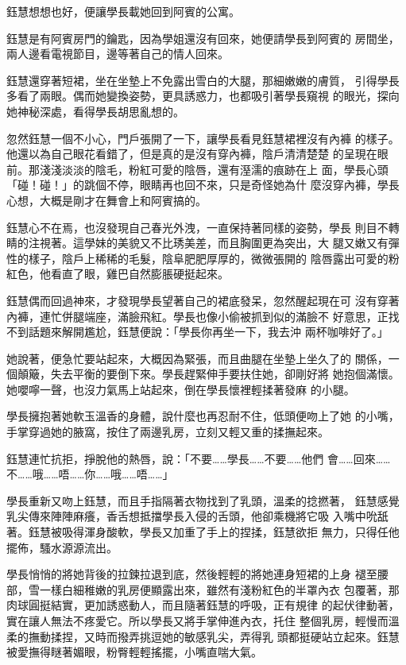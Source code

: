 鈺慧想想也好，便讓學長載她回到阿賓的公寓。

鈺慧是有阿賓房門的鑰匙，因為學姐還沒有回來，她便請學長到阿賓的
房間坐，兩人邊看電視節目，邊等著自己的情人回來。

鈺慧還穿著短裙，坐在坐墊上不免露出雪白的大腿，那細嫩嫩的膚質，
引得學長多看了兩眼。偶而她變換姿勢，更具誘惑力，也都吸引著學長窺視
的眼光，探向她神秘深處，看得學長胡思亂想的。

忽然鈺慧一個不小心，門戶張開了一下，讓學長看見鈺慧裙裡沒有內褲
的樣子。他還以為自己眼花看錯了，但是真的是沒有穿內褲，陰戶清清楚楚
的呈現在眼前。那淺淺淡淡的陰毛，粉紅可愛的陰唇，還有溼濡的痕跡在上
面，學長心頭「碰！碰！」的跳個不停，眼睛再也回不來，只是奇怪她為什
麼沒穿內褲，學長心想，大概是剛才在舞會上和阿賓搞的。

鈺慧心不在焉，也沒發現自己春光外洩，一直保持著同樣的姿勢，學長
則目不轉睛的注視著。這學妹的美貌又不比琇美差，而且胸圍更為突出，大
腿又嫩又有彈性的樣子，陰戶上稀稀的毛髮，陰阜肥肥厚厚的，微微張開的
陰唇露出可愛的粉紅色，他看直了眼，雞巴自然膨脹硬挺起來。

鈺慧偶而回過神來，才發現學長望著自己的裙底發呆，忽然醒起現在可
沒有穿著內褲，連忙併腿端座，滿臉飛紅。學長也像小偷被抓到似的滿臉不
好意思，正找不到話題來解開尷尬，鈺慧便說：「學長你再坐一下，我去沖
兩杯咖啡好了。」

她說著，便急忙要站起來，大概因為緊張，而且曲腿在坐墊上坐久了的
關係，一個顛簸，失去平衡的要倒下來。學長趕緊伸手要扶住她，卻剛好將
她抱個滿懷。她嚶嚀一聲，也沒力氣馬上站起來，倒在學長懷裡輕揉著發麻
的小腿。

學長擁抱著她軟玉溫香的身體，說什麼也再忍耐不住，低頭便吻上了她
的小嘴，手掌穿過她的腋窩，按住了兩邊乳房，立刻又輕又重的揉撫起來。

鈺慧連忙抗拒，掙脫他的熱唇，說：「不要……學長……不要……他們
會……回來……不……哦……唔……你……哦……唔……」

學長重新又吻上鈺慧，而且手指隔著衣物找到了乳頭，溫柔的捻撚著，
鈺慧感覺乳尖傳來陣陣麻癢，香舌想抵擋學長入侵的舌頭，他卻乘機將它吸
入嘴中吮舐著。鈺慧被吸得渾身酸軟，學長又加重了手上的捏揉，鈺慧欲拒
無力，只得任他擺佈，騷水源源流出。

學長悄悄的將她背後的拉鍊拉退到底，然後輕輕的將她連身短裙的上身
褪至腰部，雪一樣白細稚嫩的乳房便顯露出來，雖然有淺粉紅色的半罩內衣
包覆著，那肉球圓挺結實，更加誘惑動人，而且隨著鈺慧的呼吸，正有規律
的起伏律動著，實在讓人無法不疼愛它。所以學長又將手掌伸進內衣，托住
整個乳房，輕慢而溫柔的撫動揉捏，又時而撥弄挑逗她的敏感乳尖，弄得乳
頭都挺硬站立起來。鈺慧被愛撫得瞇著媚眼，粉臀輕輕搖擺，小嘴直喘大氣。

